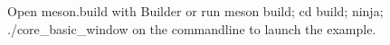 Open {\ttfamily meson.\+build} with Builder or run {\ttfamily meson build; cd build; ninja; ./core\+\_\+basic\+\_\+window} on the commandline to launch the example. 
